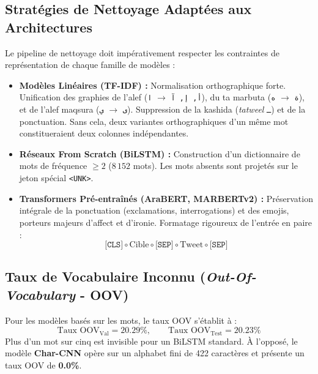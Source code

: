 \documentclass[11pt,a4paper]{article}
\begin{document}
\subsection{Stratégies de Nettoyage Adaptées aux Architectures}
Le pipeline de nettoyage doit impérativement respecter les contraintes de représentation de chaque famille de modèles :
\begin{itemize}
    \item \textbf{Modèles Linéaires (TF-IDF) :} Normalisation orthographique forte. Unification des graphies de l'alef (\texttt{أ, إ, آ} $\to$ \texttt{ا}), du ta marbuta (\texttt{ة} $\to$ \texttt{ه}), et de l'alef maqsura (\texttt{ى} $\to$ \texttt{ي}). Suppression de la kashida (\textit{tatweel} \texttt{ـ}) et de la ponctuation. Sans cela, deux variantes orthographiques d'un même mot constitueraient deux colonnes indépendantes.
    \item \textbf{Réseaux From Scratch (BiLSTM) :} Construction d'un dictionnaire de mots de fréquence $\ge 2$ ($8\,152$ mots). Les mots absents sont projetés sur le jeton spécial \texttt{<UNK>}.
    \item \textbf{Transformers Pré-entraînés (AraBERT, MARBERTv2) :} Préservation intégrale de la ponctuation (exclamations, interrogations) et des emojis, porteurs majeurs d'affect et d'ironie. Formatage rigoureux de l'entrée en paire :
    \begin{equation}
        \texttt{[CLS]} \circ \text{Cible} \circ \texttt{[SEP]} \circ \text{Tweet} \circ \texttt{[SEP]}
    \end{equation}
\end{itemize}

\subsection{Taux de Vocabulaire Inconnu (\textit{Out-Of-Vocabulary} - OOV)}
Pour les modèles basés sur les mots, le taux OOV s'établit à :
\begin{equation}
    \text{Taux OOV}_{\text{Val}} = \mathbf{20.29\%}, \qquad \text{Taux OOV}_{\text{Test}} = \mathbf{20.23\%}
\end{equation}
Plus d'un mot sur cinq est invisible pour un BiLSTM standard. À l'opposé, le modèle \textbf{Char-CNN} opère sur un alphabet fini de 422 caractères et présente un taux OOV de \textbf{0.0\%}.
\end{document}
